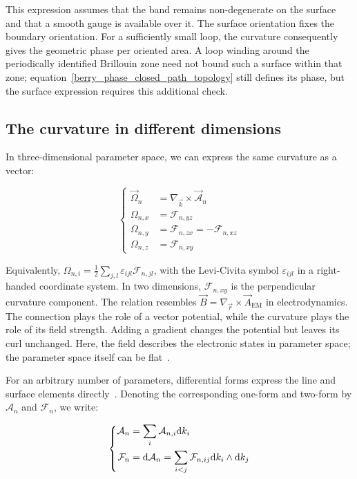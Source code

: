 This expression assumes that the band remains non-degenerate on the surface and that a smooth gauge is available over it.
The surface orientation fixes the boundary orientation.
For a sufficiently small loop, the curvature consequently gives the geometric phase per oriented area.
A loop winding around the periodically identified Brillouin zone need not bound such a surface within that zone;
equation~\eqref{berry_phase_closed_path_topology} still defines its phase, but the surface expression requires this additional check.

\FloatBarrier
\subsection{The curvature in different dimensions}

In three-dimensional parameter space, we can express the same curvature as a vector:

\begin{equation}
\left\{\begin{aligned}
    \vec{\Omega}_n&=\nabla_{\vec{k}}\times\vec{\mathcal{A}}_n \\
    \Omega_{n,x}&=\mathcal{F}_{n,yz} \\
    \Omega_{n,y}&=\mathcal{F}_{n,zx}=-\mathcal{F}_{n,xz} \\
    \Omega_{n,z}&=\mathcal{F}_{n,xy}
\end{aligned}\right.
\label{berry_curvature_vector_appendix}
\end{equation}

Equivalently, $\Omega_{n,i}=\frac{1}{2}\sum_{j,l}\varepsilon_{ijl}\mathcal{F}_{n,jl}$, with the Levi-Civita symbol $\varepsilon_{ijl}$ in a right-handed coordinate system.
In two dimensions, $\mathcal{F}_{n,xy}$ is the perpendicular curvature component.
The relation resembles $\vec{B}=\nabla_{\vec{r}}\times\vec{A}_\mathrm{EM}$ in electrodynamics.
The connection plays the role of a vector potential, while the curvature plays the role of its field strength.
Adding a gradient changes the potential but leaves its curl unchanged.
Here, the field describes the electronic states in parameter space; the parameter space itself can be flat~\cite{xiao2010berry}.

For an arbitrary number of parameters, differential forms express the line and surface elements directly~\cite{hassani2013mathematical,nakahara2018geometry}.
Denoting the corresponding one-form and two-form by $\mathcal{A}_n$ and $\mathcal{F}_n$, we write:

\begin{equation}
\left\{\begin{aligned}
    \mathcal{A}_n&=\sum_i\mathcal{A}_{n,i}\mathrm{d} k_i \\
    \mathcal{F}_n&=\mathrm{d}\mathcal{A}_n
    =\sum_{i<j}\mathcal{F}_{n,ij}\mathrm{d} k_i\wedge\mathrm{d} k_j
\end{aligned}\right.
\label{berry_differential_forms_appendix}
\end{equation}

